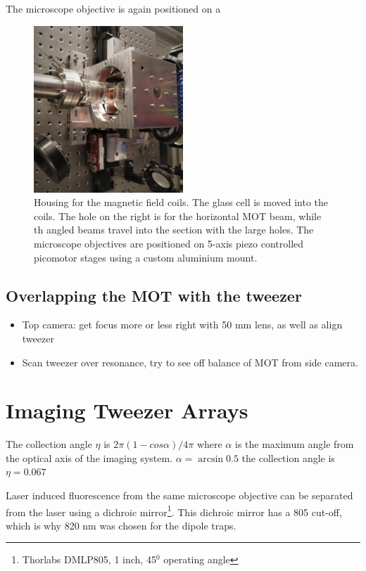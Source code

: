 The microscope objective is again positioned on a 


\begin{figure}
    \centering
    \includegraphics[width=0.5\textwidth]{figures/Coils.jpg}
    \caption{Housing for the magnetic field coils. The glass cell is moved into the coils. 
    The hole on the right is for the horizontal MOT beam, while th angled beams travel into the section with the large holes. The microscope objectives are positioned on 5-axis piezo controlled picomotor stages using a custom aluminium mount.}
    \label{fig:Coils}
\end{figure}




\subsection{Overlapping the MOT with the tweezer}\label{subsec:Overlap}

\begin{itemize}
    \item Top camera: get focus more or less right with 50 mm lens, as well as align tweezer
    \item Scan tweezer over resonance, try to see off balance of MOT from side camera. 
\end{itemize}

\section{Imaging Tweezer Arrays}\label{sec:TweezerImaging}

The collection angle $\eta$ is $2\pi(1-cos{\alpha})/4\pi$ where $\alpha$ is the maximum angle from the optical axis of the imaging system. $\alpha=\arcsin{0.5}$ the collection angle is $\eta = 0.067$

Laser induced fluorescence from the same microscope objective can be separated from the laser using a dichroic mirror\footnote{Thorlabs DMLP805, 1 inch, 45${}^{0}$ operating angle}.
This dichroic mirror has a 805 cut-off, which is why 820 nm was chosen for the dipole traps. 



